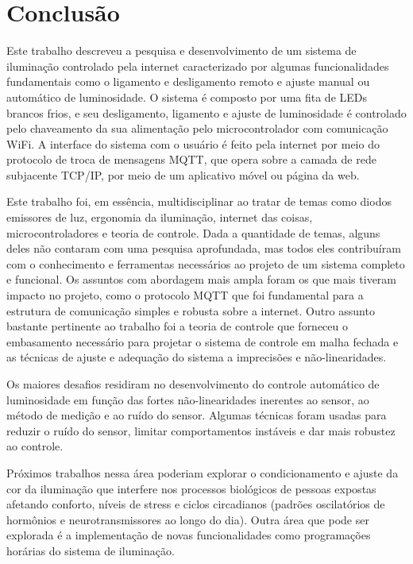\chapter{Conclusão}

Este trabalho descreveu a pesquisa e desenvolvimento de um sistema de iluminação controlado pela internet caracterizado por algumas funcionalidades fundamentais como o ligamento e desligamento remoto e ajuste manual ou automático de luminosidade. O sistema é composto por uma fita de LEDs brancos frios, e seu desligamento, ligamento e ajuste de luminosidade é controlado pelo chaveamento da sua alimentação pelo microcontrolador com comunicação WiFi. A interface do sistema com o usuário é feito pela internet por meio do protocolo de troca de mensagens MQTT, que opera sobre a camada de rede subjacente TCP/IP, por meio de um aplicativo móvel ou página da web.

Este trabalho foi, em essência, multidisciplinar ao tratar de temas como diodos emissores de luz, ergonomia da iluminação, internet das coisas, microcontroladores e teoria de controle. Dada a quantidade de temas, alguns deles não contaram com uma pesquisa aprofundada, mas todos eles contribuíram com o conhecimento e ferramentas necessários ao projeto de um sistema completo e funcional. Os assuntos com abordagem mais ampla foram os que mais tiveram impacto no projeto, como o protocolo MQTT que foi fundamental para a estrutura de comunicação simples e robusta sobre a internet. Outro assunto bastante pertinente ao trabalho foi a teoria de controle que forneceu o embasamento necessário para projetar o sistema de controle em malha fechada e as técnicas de ajuste e adequação do sistema a imprecisões e não-linearidades.

Os maiores desafios residiram no desenvolvimento do controle automático de luminosidade em função das fortes não-linearidades inerentes ao sensor, ao método de medição e ao ruído do sensor. Algumas técnicas foram usadas para reduzir o ruído do sensor, limitar comportamentos instáveis e dar mais robustez ao controle. 

Próximos trabalhos nessa área poderiam explorar o condicionamento e ajuste da cor da iluminação que interfere nos processos biológicos de pessoas expostas afetando conforto, níveis de stress e ciclos circadianos (padrões oscilatórios de hormônios e neurotransmissores ao longo do dia). Outra área que pode ser explorada é a implementação de novas funcionalidades como programações horárias do sistema de iluminação.